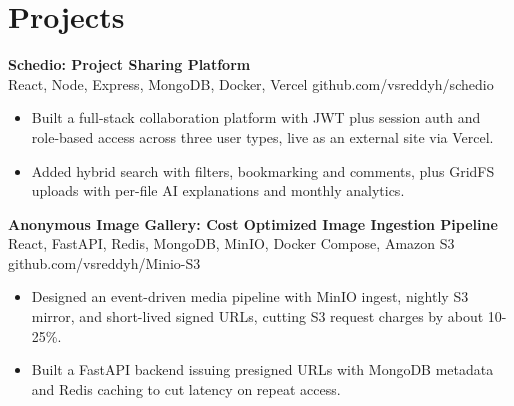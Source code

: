 \documentclass[a4paper,11pt]{article}
\newcommand{\resumeItem}[1]{\item \small{#1}}
\newcommand{\resumeSubheading}[4]{%
  \textbf{#1} \hfill \textbf{#2} \\
{#3} \hfill {#4}
}
\newcommand{\resumeSubHeadingListStart}{\begin{itemize}}
\newcommand{\resumeSubHeadingListEnd}{\end{itemize}}
\begin{document}
\section*{Projects}

\resumeSubheading
{Schedio: Project Sharing Platform}{}{React, Node, Express, MongoDB, Docker, Vercel}{github.com/vsreddyh/schedio}
\resumeSubHeadingListStart
\resumeItem{Built a full-stack collaboration platform with JWT plus session auth and role-based access across three user types, live as an external site via Vercel.}
\resumeItem{Added hybrid search with filters, bookmarking and comments, plus GridFS uploads with per-file AI explanations and monthly analytics.}
\resumeSubHeadingListEnd

\resumeSubheading
{Anonymous Image Gallery: Cost Optimized Image Ingestion Pipeline}{}{React, FastAPI, Redis, MongoDB, MinIO, Docker Compose, Amazon S3}{github.com/vsreddyh/Minio-S3}
\resumeSubHeadingListStart
\resumeItem{Designed an event-driven media pipeline with MinIO ingest, nightly S3 mirror, and short-lived signed URLs, cutting S3 request charges by about 10-25\%.}
\resumeItem{Built a FastAPI backend issuing presigned URLs with MongoDB metadata and Redis caching to cut latency on repeat access.}
\resumeSubHeadingListEnd


\vspace{-0.6em}
\end{document}
